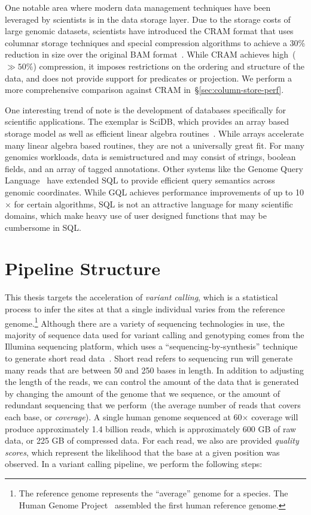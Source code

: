 \documentclass[masters]{ucbthesis}
\begin{document}
One notable area where modern data management techniques have been leveraged by scientists is in
the data storage layer. Due to the storage costs of large genomic datasets, scientists have introduced the
CRAM format that uses columnar storage techniques and special compression algorithms to achieve a
30\% reduction in size over the original BAM format~\cite{fritz11}. While CRAM achieves high~($\gg
50\%$) compression, it imposes restrictions on the ordering and structure of the data, and does not
provide support for predicates or projection. We perform a more comprehensive comparison against
CRAM in~\S\ref{sec:column-store-perf}.

One interesting trend of note is the development of databases specifically for scientific applications.
The exemplar is SciDB, which provides an array based storage model as well as efficient
linear algebra routines~\cite{brown10}. While arrays accelerate many linear algebra based routines, they
are not a universally great fit. For many genomics workloads, data is semistructured and may consist of
strings, boolean fields, and an array of tagged annotations. Other systems like the Genome Query
Language~\cite{kozanitis14} have extended SQL to provide efficient query semantics across genomic
coordinates. While GQL achieves performance improvements of up to 10$\times$ for certain algorithms,
SQL is not an attractive language for many scientific domains, which make heavy use of user designed
functions that may be cumbersome in SQL.

\section{Pipeline Structure}
\label{sec:genomics-pipeline}

This thesis targets the acceleration of \emph{variant calling}, which is a statistical process to infer the
sites at that a single individual varies from the reference genome.\footnote{The reference genome
represents the ``average'' genome for a species. The Human Genome Project~\cite{lander01} assembled
the first human reference genome.} Although there are a variety of sequencing technologies in use, the
majority of sequence data used for variant calling and genotyping comes from the Illumina sequencing
platform, which uses a ``sequencing-by-synthesis'' technique to generate short read
data~\cite{metzker09}. Short read refers to 
sequencing run will generate many reads that are between 50 and 250 bases in length. In addition to
adjusting the length of the reads, we can control the amount of the data that is generated by
changing the amount of the genome that we sequence, or the amount of redundant sequencing that
we perform~(the average number of reads that covers each base, or \emph{coverage}). A single
human genome sequenced at 60$\times$ coverage will produce approximately 1.4 billion reads,
which is approximately 600 GB of raw data, or 225 GB of compressed data. For each read, we also
are provided \emph{quality scores}, which represent the likelihood that the base at a given position
was observed. In a variant calling pipeline, we perform the following steps:
\end{document}

